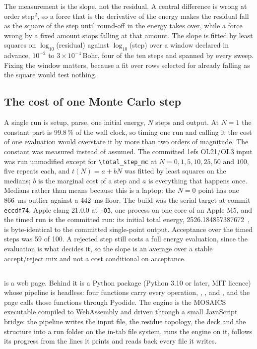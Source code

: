 The measurement is the slope, not the residual. A central difference is wrong
at order step$^2$, so a force that is the derivative of the energy makes the
residual fall as the square of the step until round-off in the energy takes
over, while a force wrong by a fixed amount stops falling at that amount. The
slope is fitted by least squares on $\log_{10}$(residual) against
$\log_{10}$(step) over a window declared in advance, $10^{-2}$ to
$3\times10^{-4}$\,Bohr, four of the ten steps and spanned by every sweep.
Fixing the window matters, because a fit over rows selected for already
falling as the square would test nothing.

\subsection{The cost of one Monte Carlo step}
\label{sec:methods-cost}

A single run is setup, parse, one initial energy, $N$ steps and output. At
$N=1$ the constant part is 99.8\,\% of the wall clock, so timing one run and
calling it the cost of one evaluation would overstate it by more than two
orders of magnitude. The constant was measured instead of assumed. The
committed 1efs OL21/OL3 input was run unmodified except for
\verb|\total_step_mc| at $N = 0, 1, 5, 10, 25, 50$ and $100$, five repeats
each, and $t(N) = a + bN$ was fitted by least squares on the medians; $b$ is
the marginal cost of a step and $a$ is everything that happens once. Medians
rather than means because this is a laptop: the $N=0$ point has one 866~ms
outlier against a 442~ms floor. The build was the serial target at commit
\texttt{eccdf74}, Apple clang 21.0.0 at \texttt{-O3}, one process on one core
of an Apple M5, and the timed run is the committed run: its initial total
energy, 2526.184857387672~\kcal{}, is byte-identical to the committed
single-point output. Acceptance over the timed steps was 59 of 100. A rejected
step still costs a full energy evaluation, since the evaluation is what decides
it, so the slope is an average over a stable accept/reject mix and not a cost
conditional on acceptance.

\subsection{\studio{}}
\label{sec:methods-studio}

\studio{} is a web page. Behind it is a Python package (Python 3.10 or later,
MIT licence) whose pipeline is headless: four functions carry every operation,
, ,
 and , and the page calls those
functions through Pyodide. The engine is the MOSAICS executable compiled
to WebAssembly and driven through a small JavaScript bridge: the pipeline
writes the input file, the residue topology, the deck and the structure into a
run folder on the in-tab file system, runs the engine on it, follows its
progress from the lines it prints and reads back every file it writes.

